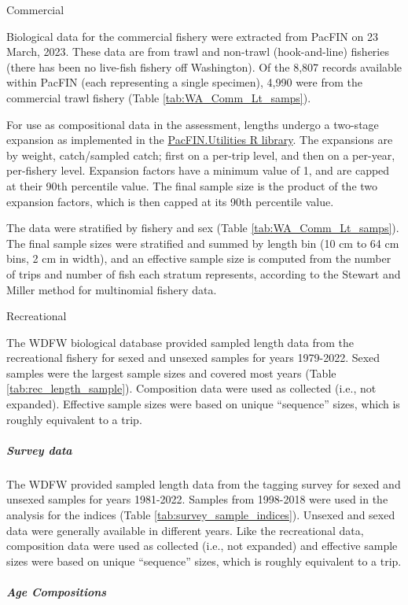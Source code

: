\documentclass[11pt,
  english,
  letterpaper,
]{article}
\begin{document}
Commercial

Biological data for the commercial fishery were extracted from PacFIN on 23 March, 2023. These data are from trawl and non-trawl (hook-and-line) fisheries (there has been no live-fish fishery off Washington). Of the 8,807 records available within PacFIN (each representing a single specimen), 4,990 were from the commercial trawl fishery (Table \ref{tab:WA_Comm_Lt_samps}).

For use as compositional data in the assessment, lengths undergo a two-stage expansion as implemented in the \href{https://github.com/pfmc-assessments/PacFIN.Utilities}{PacFIN.Utilities R library}. The expansions are by weight, catch/sampled catch; first on a per-trip level, and then on a per-year, per-fishery level. Expansion factors have a minimum value of 1, and are capped at their 90th percentile value. The final sample size is the product of the two expansion factors, which is then capped at its 90th percentile value.

The data were stratified by fishery and sex (Table \ref{tab:WA_Comm_Lt_samps}). The final sample sizes were stratified and summed by length bin (10 cm to 64 cm bins, 2 cm in width), and an effective sample size is computed from the number of trips and number of fish each stratum represents, according to the Stewart and Miller method for multinomial fishery data.

Recreational

The WDFW biological database provided sampled length data from the recreational fishery for sexed and unsexed samples for years 1979-2022. Sexed samples were the largest sample sizes and covered most years (Table \ref{tab:rec_length_sample}). Composition data were used as collected (i.e., not expanded). Effective sample sizes were based on unique ``sequence'' sizes, which is roughly equivalent to a trip.

\hypertarget{survey-data}{%
\subparagraph{Survey data}\label{survey-data}}

The WDFW provided sampled length data from the tagging survey for sexed and unsexed samples for years 1981-2022. Samples from 1998-2018 were used in the analysis for the indices (Table \ref{tab:survey_sample_indices}). Unsexed and sexed data were generally available in different years. Like the recreational data, composition data were used as collected (i.e., not expanded) and effective sample sizes were based on unique ``sequence'' sizes, which is roughly equivalent to a trip.

\hypertarget{age-compositions}{%
\subparagraph{Age Compositions}\label{age-compositions}}
\end{document}
